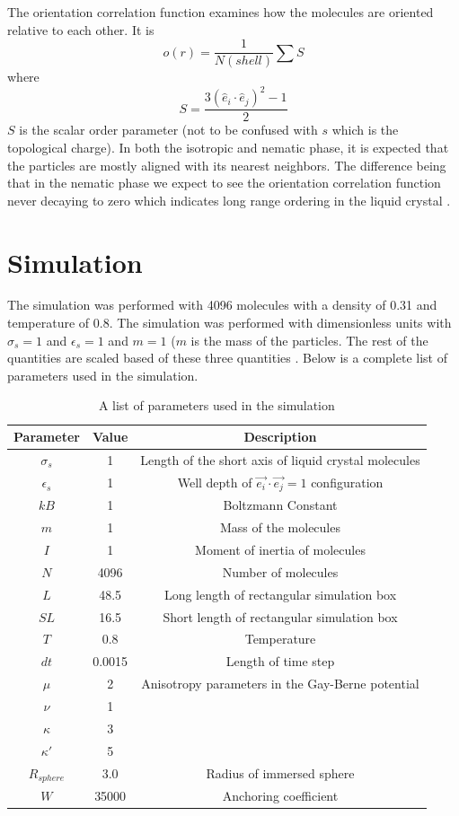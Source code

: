 \documentclass[preprint, aps]{revtex4-1}
\begin{document}
The orientation correlation function examines how the molecules are oriented
relative to each other. It is
	\begin{equation}
		o(r) = \frac{1}{N(shell)}\sum S
	\end{equation}
where
	\begin{equation}\label{sop}
		S = \frac{3(\hat{e}_i \cdot \hat{e}_j)^2-1}{2}
	\end{equation}
$S$ is the scalar order parameter (not to be confused with $s$ which is the
topological charge). In both the isotropic and nematic phase, it is expected
that the particles are mostly aligned with its nearest neighbors. The difference
being that in the nematic phase we expect to see the orientation correlation
function never decaying to zero which indicates long range ordering in the
liquid crystal
\cite{frenkel01}.
		
\section*{Simulation}
The simulation was performed with 4096 molecules with a density of 0.31 and
temperature of 0.8. The simulation was performed with
dimensionless units with $\sigma_s=1$ and $\epsilon_s=1$ and $m=1$ ($m$ is the
mass of the particles. The rest of the quantities are scaled based of these
three quantities \cite{frenkel01}. Below is a complete list of parameters used 
in the simulation.
\begin{table}[H]
\centering
	\begin{tabular}{|c|c||c|}
		\hline
		Parameter & Value & Description \\
		\hline \hline
		$\sigma_s$ & 1 & Length of the short axis of liquid crystal molecules\\
		$\epsilon_s$ & 1 & Well depth of $\vec{e_i}\cdot\vec{e_j}=1$
		configuration \\
		$kB$ & 1 & Boltzmann Constant \\
		$m$ & 1 & Mass of the molecules \\
		$I$ & 1 & Moment of inertia of molecules \\
		$N$ & 4096 & Number of molecules \\
		$L$ & 48.5 & Long length of rectangular simulation box \\
		$SL$ & 16.5 & Short length of rectangular simulation box \\
		$T$ & 0.8 & Temperature \\
		$dt$ & 0.0015 & Length of time step \\
		\hline
		$\mu$ & 2 & Anisotropy parameters in the Gay-Berne potential \\
		$\nu$ & 1 & \\
		$\kappa$ & 3 & \\
		$\kappa'$ & 5 & \\
		\hline
		$R_{sphere}$ & 3.0 & Radius of immersed sphere \\
		$W$ & 35000 & Anchoring coefficient \\
		\hline
	\end{tabular}
\caption{A list of parameters used in the simulation}
\label{table:params}
\end{table}
\end{document}
